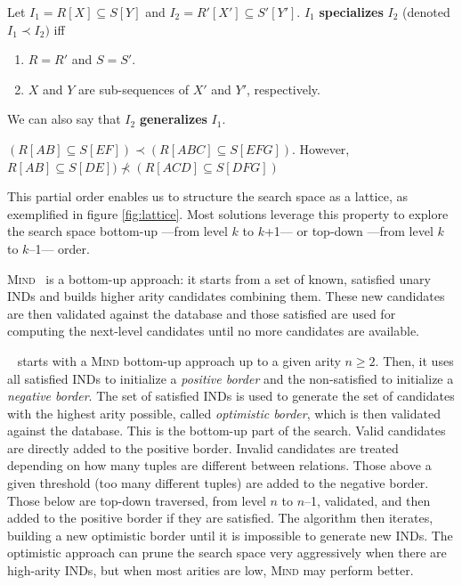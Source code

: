 \begin{definition}
    \label{def:specialization}
    Let $I_1 = R[X] \subseteq S[Y]$ and
    $I_2 = R'[X'] \subseteq S'[Y']$. $I_1$ \textbf{specializes} $I_2$ (denoted $I_1 \prec I_2)$ iff
    
    \begin{enumerate}
        \item $R = R'$ and $S = S'$.
        \item $X$ and $Y$ are sub-sequences of $X'$ and $Y'$, respectively.
    \end{enumerate}
    
    We can also say that $I_2$ \textbf{generalizes} $I_1$.
\end{definition}

\begin{example}
$(R[AB] \subseteq S[EF]) \prec (R[ABC] \subseteq S[EFG])$. However,
$R[AB] \subseteq S[DE]) \nprec (R[ACD] \subseteq S[DFG])$
\end{example}

This partial order enables us to structure the search space as a lattice, as exemplified in figure
\ref{fig:lattice}. Most solutions leverage this property to explore the search space bottom-up
---from level $k$ to $k$+1--- or top-down ---from level $k$ to $k$--1--- order.

\textsc{Mind}~\cite{DeMarchi2002} is a bottom-up approach: it starts
from a set of known, satisfied unary \glspl{IND} and builds higher arity candidates
combining them.
These new candidates are then validated against the database and those satisfied
are used for computing the next-level candidates until no more candidates are available.

\Zigzag~\cite{DeMarchi2003zigzag} starts with a \textsc{Mind} bottom-up approach
up to a given arity $n \ge 2$. Then, it uses all satisfied \glspl{IND} to initialize a \textit{positive border}
and the non-satisfied to initialize a \textit{negative border}. The set of satisfied \glspl{IND}
is used to generate the set of candidates with the highest arity possible, called
\textit{optimistic border},
which is then validated against the database. This is the bottom-up part of the search.
Valid candidates are directly added to the positive border.
Invalid candidates are treated depending on how many tuples are different between relations.
Those above a given threshold (too many different tuples) are added to the negative border.
Those below are top-down traversed, from level $n$ to $n$--1, validated, and then added
to the positive border if they are satisfied. The algorithm then iterates, building a new
optimistic border until it is impossible to generate new \glspl{IND}. The optimistic approach
can prune the search space very aggressively when there are high-arity \glspl{IND},
but when most arities are low,  \textsc{Mind} may perform better.

